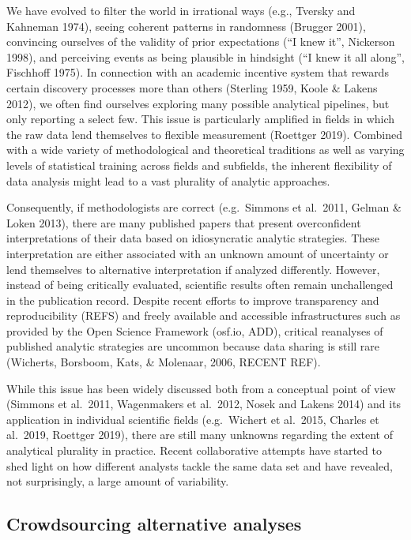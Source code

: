 \documentclass[
  english,
  man]{apa6}
\begin{document}
We have evolved to filter the world in irrational ways (e.g., Tversky and Kahneman 1974), seeing coherent patterns in randomness (Brugger 2001), convincing ourselves of the validity of prior expectations (\enquote{I knew it}, Nickerson 1998), and perceiving events as being plausible in hindsight (\enquote{I knew it all along}, Fischhoff 1975).
In connection with an academic incentive system that rewards certain discovery processes more than others (Sterling 1959, Koole \& Lakens 2012), we often find ourselves exploring many possible analytical pipelines, but only reporting a select few.
This issue is particularly amplified in fields in which the raw data lend themselves to flexible measurement (Roettger 2019).
Combined with a wide variety of methodological and theoretical traditions as well as varying levels of statistical training across fields and subfields, the inherent flexibility of data analysis might lead to a vast plurality of analytic approaches.

Consequently, if methodologists are correct (e.g.~Simmons et al.~2011, Gelman \& Loken 2013), there are many published papers that present overconfident interpretations of their data based on idiosyncratic analytic strategies.
These interpretation are either associated with an unknown amount of uncertainty or lend themselves to alternative interpretation if analyzed differently.
However, instead of being critically evaluated, scientific results often remain unchallenged in the publication record.
Despite recent efforts to improve transparency and reproducibility (REFS) and freely available and accessible infrastructures such as provided by the Open Science Framework (osf.io, ADD), critical reanalyses of published analytic strategies are uncommon because data sharing is still rare (Wicherts, Borsboom, Kats, \& Molenaar, 2006, RECENT REF).

While this issue has been widely discussed both from a conceptual point of view (Simmons et al.~2011, Wagenmakers et al.~2012, Nosek and Lakens 2014) and its application in individual scientific fields (e.g.~Wichert et al.~2015, Charles et al.~2019, Roettger 2019), there are still many unknowns regarding the extent of analytical plurality in practice.
Recent collaborative attempts have started to shed light on how different analysts tackle the same data set and have revealed, not surprisingly, a large amount of variability.

\hypertarget{crowdsourcing-alternative-analyses}{%
\subsection{Crowdsourcing alternative analyses}\label{crowdsourcing-alternative-analyses}}
\end{document}
